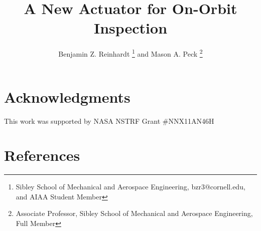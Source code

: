 \documentclass{AIAA}
\begin{document}
\title{A New Actuator for On-Orbit Inspection}
\author{Benjamin Z. Reinhardt \footnote{Sibley School of Mechanical and Aerospace Engineering, bzr3@cornell.edu, and AIAA Student Member} and Mason A. Peck \footnote{Associate Professor, Sibley School of Mechanical and Aerospace Engineering, Full Member}}

 

\maketitle






%





\section*{Acknowledgments}
This work was supported by NASA NSTRF Grant \#NNX11AN46H %
\section*{References}


\end{document}
